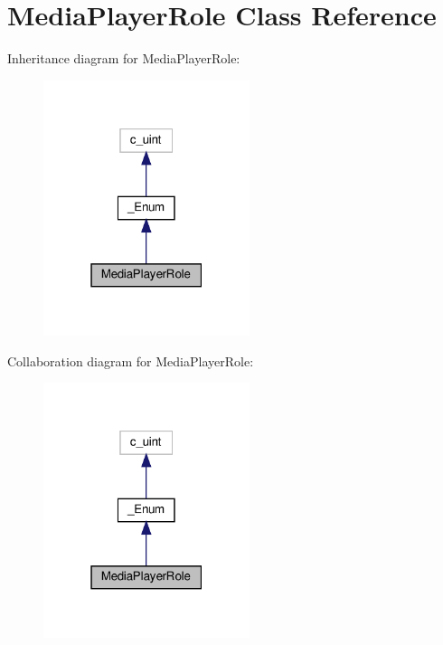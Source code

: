 \hypertarget{classvlc_1_1_media_player_role}{}\section{Media\+Player\+Role Class Reference}
\label{classvlc_1_1_media_player_role}


Inheritance diagram for Media\+Player\+Role\+:
\nopagebreak
\begin{figure}[H]
\begin{center}
\leavevmode
\includegraphics[width=171pt]{classvlc_1_1_media_player_role__inherit__graph}
\end{center}
\end{figure}


Collaboration diagram for Media\+Player\+Role\+:
\nopagebreak
\begin{figure}[H]
\begin{center}
\leavevmode
\includegraphics[width=171pt]{classvlc_1_1_media_player_role__coll__graph}
\end{center}
\end{figure}
